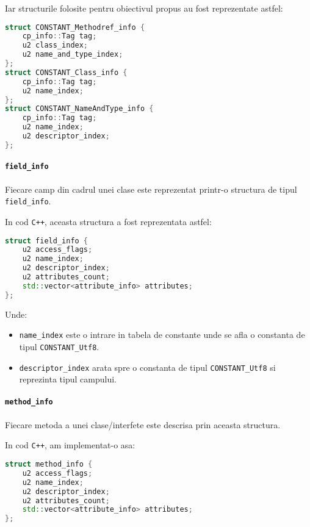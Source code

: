 Iar structurile folosite pentru obiectivul propus au fost reprezentate
astfel:

\begin{lstlisting}[language=C++]
struct CONSTANT_Methodref_info {
    cp_info::Tag tag;
    u2 class_index;
    u2 name_and_type_index;
};
struct CONSTANT_Class_info {
    cp_info::Tag tag;
    u2 name_index;
};
struct CONSTANT_NameAndType_info {
    cp_info::Tag tag;
    u2 name_index;
    u2 descriptor_index;
};
\end{lstlisting}

\paragraph{\texorpdfstring{\texttt{field\_info}}{field\_info}}\label{field_info}

Fiecare camp din cadrul unei clase este reprezentat printr-o structura
de tipul \texttt{field\_info}.

In cod \texttt{C++}, aceasta structura a fost reprezentata astfel:

\begin{lstlisting}[language=C++]
struct field_info {
    u2 access_flags;
    u2 name_index;
    u2 descriptor_index;
    u2 attributes_count;
    std::vector<attribute_info> attributes;
};
\end{lstlisting}

Unde:
\begin{itemize}
    \item \texttt{name\_index} este o intrare in tabela de constante unde se afla o constanta de tipul \texttt{CONSTANT\_Utf8}.
    \item \texttt{descriptor\_index} arata spre o constanta de tipul \texttt{CONSTANT\_Utf8} si reprezinta tipul campului.
\end{itemize}

\paragraph{\texorpdfstring{\texttt{method\_info}}{method\_info}}\label{method_info}

Fiecare metoda a unei clase/interfete este descrisa prin aceasta
structura.

In cod \texttt{C++}, am implementat-o asa:

\begin{lstlisting}[language=C++]
struct method_info {
    u2 access_flags;
    u2 name_index;
    u2 descriptor_index;
    u2 attributes_count;
    std::vector<attribute_info> attributes;
};
\end{lstlisting}

